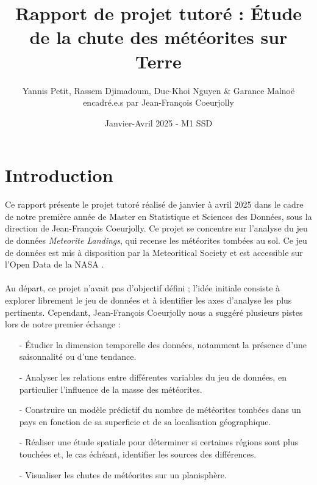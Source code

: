 \documentclass[12pt]{article}
\begin{document}
\title{Rapport de projet tutoré : Étude de la chute des météorites sur Terre}
\author{Yannis Petit, Rassem Djimadoum, Duc-Khoi Nguyen \& Garance Malnoë \\ encadré.e.s par Jean-François Coeurjolly}
\date{Janvier-Avril 2025 - M1 SSD}

\maketitle
\tableofcontents
\clearpage
{}
\section{Introduction}
Ce rapport présente le projet tutoré réalisé de janvier à avril 2025 dans le cadre de notre première année de Master en Statistique et Sciences des Données, sous la direction de Jean-François Coeurjolly. Ce projet se concentre sur l'analyse du jeu de données \textit{Meteorite Landings}, qui recense les météorites tombées au sol. Ce jeu de données est mis à disposition par la Meteoritical Society et est accessible sur l'Open Data de la NASA \cite{OpenData_NASA}.\\
\\
Au départ, ce projet n'avait pas d'objectif défini ; l'idée initiale consiste à explorer librement le jeu de données et à identifier les axes d'analyse les plus pertinents. Cependant, Jean-François Coeurjolly nous a suggéré plusieurs pistes lors de notre premier échange :\\
\begin{itemize}
	\item[-] Étudier la dimension temporelle des données, notamment la présence d'une saisonnalité ou d'une tendance.\\
	\item[-] Analyser les relations entre différentes variables du jeu de données, en particulier l'influence de la masse des météorites.\\
	\item[-] Construire un modèle prédictif du nombre de météorites tombées dans un pays en fonction de sa superficie et de sa localisation géographique.\\
	\item[-] Réaliser une étude spatiale pour déterminer si certaines régions sont plus touchées et, le cas échéant, identifier les sources des différences.\\
	\item[-] Visualiser les chutes de météorites sur un planisphère.\\
\end{itemize}
\end{document}
